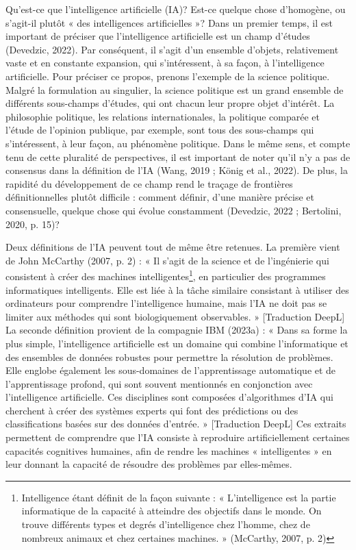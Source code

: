 \documentclass[
  letterpaper,
  DIV=11,
  numbers=noendperiod]{scrreprt}
\begin{document}
Qu'est-ce que l'intelligence artificielle (IA)? Est-ce quelque chose
d'homogène, ou s'agit-il plutôt « des intelligences artificielles »?
Dans un premier temps, il est important de préciser que l'intelligence
artificielle est un champ d'études (Devedzic, 2022). Par conséquent, il
s'agit d'un ensemble d'objets, relativement vaste et en constante
expansion, qui s'intéressent, à sa façon, à l'intelligence artificielle.
Pour préciser ce propos, prenons l'exemple de la science politique.
Malgré la formulation au singulier, la science politique est un grand
ensemble de différents sous-champs d'études, qui ont chacun leur propre
objet d'intérêt. La philosophie politique, les relations
internationales, la politique comparée et l'étude de l'opinion publique,
par exemple, sont tous des sous-champs qui s'intéressent, à leur façon,
au phénomène politique. Dans le même sens, et compte tenu de cette
pluralité de perspectives, il est important de noter qu'il n'y a pas de
consensus dans la définition de l'IA (Wang, 2019 ; König et al., 2022).
De plus, la rapidité du développement de ce champ rend le traçage de
frontières définitionnelles plutôt difficile : comment définir, d'une
manière précise et consensuelle, quelque chose qui évolue constamment
(Devedzic, 2022 ; Bertolini, 2020, p. 15)?

Deux définitions de l'IA peuvent tout de même être retenues. La première
vient de John McCarthy (2007, p. 2) : « Il s'agit de la science et de
l'ingénierie qui consistent à créer des machines
intelligentes\footnote{Intelligence étant définit de la façon suivante :
  « L'intelligence est la partie informatique de la capacité à atteindre
  des objectifs dans le monde. On trouve différents types et degrés
  d'intelligence chez l'homme, chez de nombreux animaux et chez
  certaines machines. » (McCarthy, 2007, p. 2)}, en particulier des
programmes informatiques intelligents. Elle est liée à la tâche
similaire consistant à utiliser des ordinateurs pour comprendre
l'intelligence humaine, mais l'IA ne doit pas se limiter aux méthodes
qui sont biologiquement observables. » {[}Traduction DeepL{]} La seconde
définition provient de la compagnie IBM (2023a) : « Dans sa forme la
plus simple, l'intelligence artificielle est un domaine qui combine
l'informatique et des ensembles de données robustes pour permettre la
résolution de problèmes. Elle englobe également les sous-domaines de
l'apprentissage automatique et de l'apprentissage profond, qui sont
souvent mentionnés en conjonction avec l'intelligence artificielle. Ces
disciplines sont composées d'algorithmes d'IA qui cherchent à créer des
systèmes experts qui font des prédictions ou des classifications basées
sur des données d'entrée. » {[}Traduction DeepL{]} Ces extraits
permettent de comprendre que l'IA consiste à reproduire artificiellement
certaines capacités cognitives humaines, afin de rendre les machines «
intelligentes » en leur donnant la capacité de résoudre des problèmes
par elles-mêmes.
\end{document}
